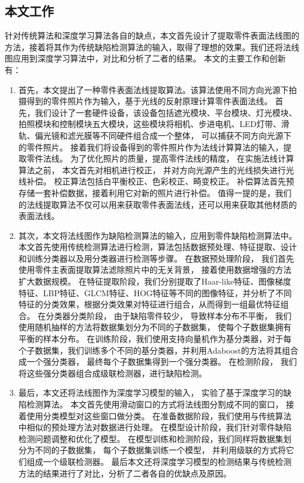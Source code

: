 \subsection{本文工作}

针对传统算法和深度学习算法各自的缺点，本文首先设计了提取零件表面法线图的方法，接着将其作为传统缺陷检测算法的输入，取得了理想的效果。我们还将法线图应用到深度学习算法中，对比和分析了二者的结果。
本文的主要工作和创新有：
\begin{enumerate}

\item 首先，本文提出了一种零件表面法线提取算法。该算法使用不同方向光源下拍摄得到的零件照片作为输入，基于光线的反射原理计算零件表面法线。
首先，我们设计了一套硬件设备，该设备包括遮光模块、平台模块、灯光模块、拍照模块和控制模块五大模块，这些模块将相机、步进电机、LED灯带、滑轨、偏光镜和滤光膜等不同硬件组合成一个整体，
可以捕获不同方向光源下的零件照片。
接着我们将设备得到的零件照片作为法线计算算法的输入，提取零件法线。
为了优化照片的质量，提高零件法线的精度，
在实施法线计算算法之前，
本文首先对相机进行校正，
并对方向光源产生的光线损失进行光线补偿。
校正算法包括白平衡校正、色彩校正、畸变校正。
补偿算法首先预存储一套补偿数据，接着利用它对新的照片进行补偿。
值得一提的是，我们的法线提取算法不仅可以用来获取零件表面法线，还可以用来获取其他材质的表面法线。

\item 其次，本文将法线图作为缺陷检测算法的输入，应用到零件缺陷检测算法中。
本文首先使用传统检测算法进行检测，算法包括数据预处理、特征提取、设计和训练分类器以及用分类器进行检测等步骤。
在数据预处理阶段，
我们首先使用零件主表面提取算法滤除照片中的无关背景，
接着使用数据增强的方法扩大数据规模。
在特征提取阶段，我们分别提取了Haar-like特征、图像梯度特征、LBP特征、GLCM特征、HOG特征等不同的图像特征，并分析了不同特征的分类效果，根据分类效果对特征进行组合，从而得到一组最优特征组合。
在分类器分类阶段，
由于缺陷零件较少，
导致样本分布不平衡，
我们使用随机抽样的方法将数据集划分为不同的子数据集，
使每个子数据集拥有平衡的样本分布。
在训练阶段，我们使用支持向量机作为基分类器，对于每个子数据集，我们训练多个不同的基分类器，并利用Adaboost的方法将其组合成一个强分类器，
最终每个子数据集得到一个强分类器。
在检测阶段，
我们将这些强分类器组合成级联检测器，进行缺陷检测。

\item 最后，本文还将法线图作为深度学习模型的输入，
实验了基于深度学习的缺陷检测算法。
本文首先使用滑动窗口的方式将法线图分割成不同的窗口，
接着使用分类模型对这些窗口做分类。
在准备数据阶段，我们使用与传统算法中相似的预处理方法对数据进行处理。
在模型设计阶段，我们针对零件缺陷检测问题调整和优化了模型。
在模型训练和检测阶段，我们同样将数据集划分为不同的子数据集，
每个子数据集训练一个模型，
并利用级联的方式将它们组成一个级联检测器。
最后本文还将深度学习模型的检测结果与传统检测方法的结果进行了对比，分析了二者各自的优缺点及原因。

\end{enumerate}
